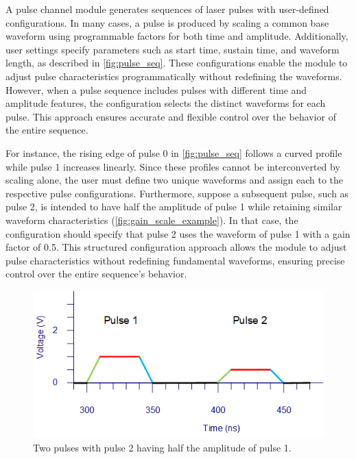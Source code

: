 
A pulse channel module generates sequences of laser pulses with user-defined configurations. In many cases, a pulse is produced by scaling a common base waveform using programmable factors for both time and amplitude. Additionally, user settings specify parameters such as start time, sustain time, and waveform length, as described in \autoref{fig:pulse_seq}. These configurations enable the module to adjust pulse characteristics programmatically without redefining the waveforms. However, when a pulse sequence includes pulses with different time and amplitude features, the configuration selects the distinct waveforms for each pulse. This approach ensures accurate and flexible control over the behavior of the entire sequence. 

For instance, the rising edge of pulse 0 in \autoref{fig:pulse_seq} follows a curved profile while pulse 1 increases linearly. Since these profiles cannot be interconverted by scaling alone, the user must define two unique waveforms and assign each to the respective pulse configurations. Furthermore, suppose a subsequent pulse, such as pulse 2, is intended to have half the amplitude of pulse 1 while retaining similar waveform characteristics (\autoref{fig:gain_scale_example}). In that case, the configuration should specify that pulse 2 uses the waveform of pulse 1 with a gain factor of 0.5. This structured configuration approach allows the module to adjust pulse characteristics without redefining fundamental waveforms, ensuring precise control over the entire sequence's behavior.

\begin{figure}[ht]
    \centering
    \includegraphics[width=0.7\linewidth]{figures/3.1.1.png}
    \caption{Two pulses with pulse 2 having half the amplitude of pulse 1.}
    \label{fig:gain_scale_example}
\end{figure}

